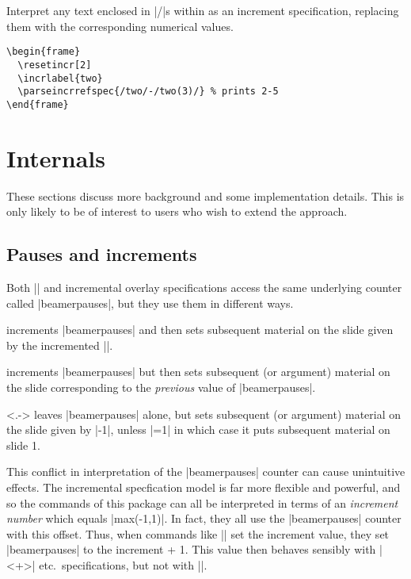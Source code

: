 \documentclass[a4paper]{ltxdoc}
\begin{document}
\begin{command}{\parseincrrefspec {}}
  Interpret any text enclosed in |/|s within  as an increment
  specification, replacing them with the corresponding numerical values.
  \example
\begin{verbatim}
\begin{frame}
  \resetincr[2]
  \incrlabel{two}
  \parseincrrefspec{/two/-/two(3)/} % prints 2-5
\end{frame}
\end{verbatim}
  
\end{command}




\section{Internals}\label{sec:internals}

These sections discuss more background and some implementation details.   This
is only likely to be of interest to users who wish to extend the approach.

\subsection{Pauses and increments}

Both |\pause| and incremental overlay specifications access the same underlying
counter called |beamerpauses|, but they use them in different ways.

\begin{command}{\pause}
  increments |beamerpauses| and then sets subsequent material on the slide
  given by the incremented |\value{beamerpauses}|. 
\end{command}

\begin{command}{\onslide<+->}
  increments |beamerpauses| but then sets subsequent (or argument) material on
  the slide corresponding to the \emph{previous} value of |beamerpauses|.
\end{command}

\begin{command}{\onslide<.->}
  leaves |beamerpauses| alone, but sets subsequent (or argument) material on the
  slide given by |\value{beamerpauses}-1|, unless |\value{beamerpauses}=1| in
  which case it puts subsequent material on slide 1.
\end{command}

This conflict in interpretation of the |beamerpauses| counter can cause
unintuitive effects.  The incremental specfication model is far more flexible
and powerful, and so the commands of this package can all be interpreted in
terms of an \emph{increment number} which equals
|max(\value{beamerpauses}-1,1)|.  In fact, they all use the |beamerpauses|
counter with this offset.  Thus, when commands like |\resetincr| set the
increment value, they set |beamerpauses| to the increment + 1.  This value then
behaves sensibly with |<+>| etc.\ specifications, but not with |\pause|.  
\end{document}
